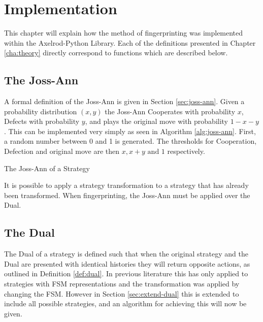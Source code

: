
\chapter{Implementation}\label{cha:implementation}

This chapter will explain how the method of fingerprinting was implemented within the Axelrod-Python Library.
Each of the definitions presented in Chapter \ref{cha:theory} directly correspond to functions which are described below.




\section{The Joss-Ann}

A formal definition of the Joss-Ann is given in Section \ref{sec:joss-ann}.
Given a probability distribution $(x, y)$ the Joss-Ann Cooperates with probability $x$, Defects with probability $y$, and plays the original move with probability $1 -x-y$.
This can be implemented very simply as seen in Algorithm \ref{alg:joss-ann}.
First, a random number between 0 and 1 is generated.
The thresholds for Cooperation, Defection and original move are then $x, x+y \text{ and } 1$ respectively.

\begin{algorithm}[H]
 \caption{The Joss-Ann of a Strategy}
 \label{alg:joss-ann}
\end{algorithm}

It is possible to apply a strategy transformation to a strategy that has already been transformed.
When fingerprinting, the Joss-Ann must be applied over the Dual.


\section{The Dual}
The Dual of a strategy is defined such that when the original strategy and the Dual are presented with identical histories they will return opposite actions, as outlined in Definition \ref{def:dual}.
In previous literature this has only applied to strategies with FSM representations \cite{Ashlock2008, Ashlock2010, Ashlock2004,  Ashlock2005, Ashlock2009, Ashlock2006} and the transformation was applied by changing the FSM.
However in Section \ref{sec:extend-dual} this is extended to include all possible strategies, and an algorithm for achieving this will now be given.

